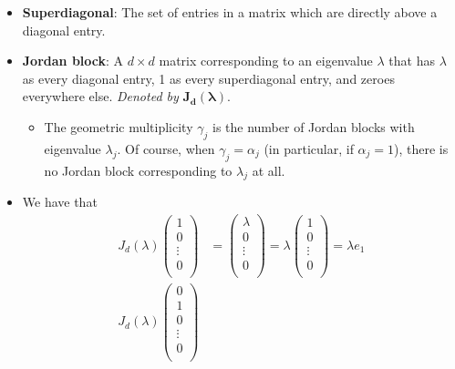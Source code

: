 \documentclass[../notes.tex]{subfiles}
\begin{document}
\begin{itemize}
\begin{itemize}
    \end{itemize}
    \item \textbf{Superdiagonal}: The set of entries in a matrix which are directly above a diagonal entry.
    \item \textbf{Jordan block}: A $d\times d$ matrix corresponding to an eigenvalue $\lambda$ that has $\lambda$ as every diagonal entry, 1 as every superdiagonal entry, and zeroes everywhere else. \emph{Denoted by} $\bm{J_d(\lambda)}$.
    \begin{itemize}
        \item The geometric multiplicity $\gamma_j$ is the number of Jordan blocks with eigenvalue $\lambda_j$. Of course, when $\gamma_j=\alpha_j$ (in particular, if $\alpha_j=1$), there is no Jordan block corresponding to $\lambda_j$ at all.
    \end{itemize}
    \item We have that
    \begin{align*}
        J_d(\lambda)
        \begin{pmatrix}
            1\\
            0\\
            \vdots\\
            0\\
        \end{pmatrix}
        &=
        \begin{pmatrix}
            \lambda\\
            0\\
            \vdots\\
            0\\
        \end{pmatrix}
        = \lambda
        \begin{pmatrix}
            1\\
            0\\
            \vdots\\
            0\\
        \end{pmatrix}
        = \lambda e_1\\
        J_d(\lambda)
        \begin{pmatrix}
            0\\
            1\\
            0\\
            \vdots\\
            0\\
        \end{pmatrix}

\end{align*}
\end{itemize}
\end{document}
